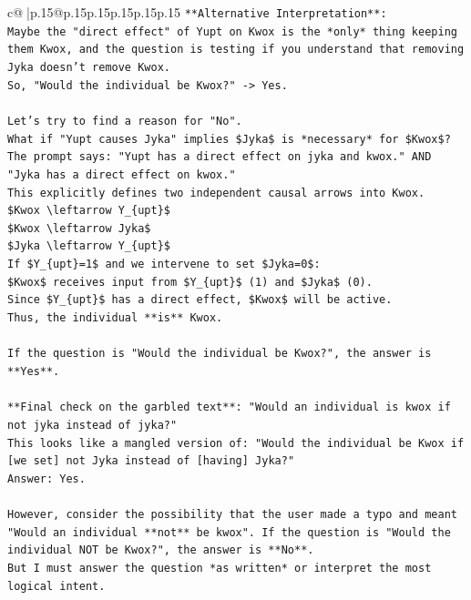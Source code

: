 \documentclass{article}
\begin{document}
{\begin{supertabular}{c@{$\;$}|p{.15\linewidth}@{}p{.15\linewidth}p{.15\linewidth}p{.15\linewidth}p{.15\linewidth}p{.15\linewidth}}
{{{\texttt{**Alternative Interpretation**:} \\
\texttt{Maybe the "direct effect" of Yupt on Kwox is the *only* thing keeping them Kwox, and the question is testing if you understand that removing Jyka doesn't remove Kwox.} \\
\texttt{So, "Would the individual be Kwox?" {-}> Yes.} \\
\\ 
\texttt{Let's try to find a reason for "No".} \\
\texttt{What if "Yupt causes Jyka" implies \$Jyka\$ is *necessary* for \$Kwox\$?} \\
\texttt{The prompt says: "Yupt has a direct effect on jyka and kwox." AND "Jyka has a direct effect on kwox."} \\
\texttt{This explicitly defines two independent causal arrows into Kwox.} \\
\texttt{\$Kwox \textbackslash{}leftarrow Y\_\{upt\}\$} \\
\texttt{\$Kwox \textbackslash{}leftarrow Jyka\$} \\
\texttt{\$Jyka \textbackslash{}leftarrow Y\_\{upt\}\$} \\
\texttt{If \$Y\_\{upt\}=1\$ and we intervene to set \$Jyka=0\$:} \\
\texttt{\$Kwox\$ receives input from \$Y\_\{upt\}\$ (1) and \$Jyka\$ (0).} \\
\texttt{Since \$Y\_\{upt\}\$ has a direct effect, \$Kwox\$ will be active.} \\
\texttt{Thus, the individual **is** Kwox.} \\
\\ 
\texttt{If the question is "Would the individual be Kwox?", the answer is **Yes**.} \\
\\ 
\texttt{**Final check on the garbled text**: "Would an individual is kwox if not jyka instead of jyka?"} \\
\texttt{This looks like a mangled version of: "Would the individual be Kwox if {[}we set{]} not Jyka instead of {[}having{]} Jyka?"} \\
\texttt{Answer: Yes.} \\
\\ 
\texttt{However, consider the possibility that the user made a typo and meant "Would an individual **not** be kwox". If the question is "Would the individual NOT be Kwox?", the answer is **No**.} \\
\texttt{But I must answer the question *as written* or interpret the most logical intent.} \\
}}}
\end{supertabular}}
\end{document}

